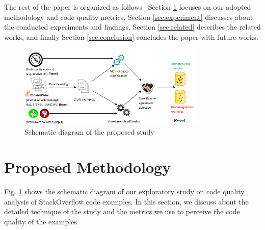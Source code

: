 \documentclass{sig-alternate}
\begin{document}
The rest of the paper is organized as follows-- Section \ref{sec:theory}  focuses on our adopted methodology and code quality metrics, Section \ref{sec:experiment} discusses about the conducted experiments and findings, Section \ref{sec:related} describes the related works, and finally Section \ref{sec:conclusion} concludes the paper with future works.
\begin{figure}[!t]
\centering
\includegraphics[width=3.5in]{sysdiag}
\caption{Schematic diagram of the proposed study}
\label{fig:sysdiag}
\end{figure}

\section{Proposed Methodology}
\label{sec:theory}
Fig. \ref{fig:sysdiag} shows the schematic diagram of our exploratory study on code quality analysis of StackOverflow code examples. In this section, we discuss about the detailed technique of the study and the metrics we use to perceive the code quality of the examples.
\end{document}
